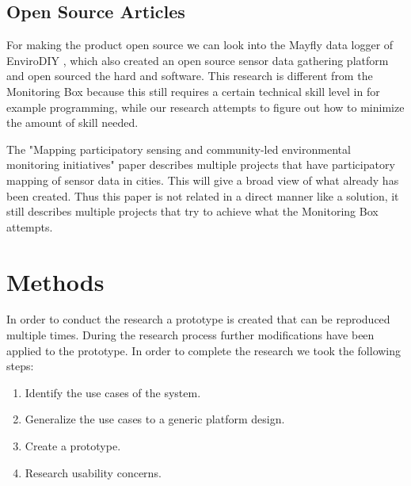 \documentclass[conference]{IEEEtran}
\begin{document}
\subsection{Open Source Articles}
For making the product open source we can look into the Mayfly data logger of EnviroDIY \cite{arscott2017publishing},  which also created an open source sensor data gathering platform and open sourced the hard and software. This research is different from the Monitoring Box because this still requires a certain technical skill level in for example programming, while our research attempts to figure out how to minimize the amount of skill needed.
\par
The "Mapping participatory sensing and community-led environmental monitoring initiatives" \cite{balestrinideliverable} paper describes multiple projects that have participatory mapping of sensor data in cities. This will give a broad view of what already has been created. Thus this paper is not related in a direct manner like a solution, it still describes multiple projects that try to achieve what the Monitoring Box attempts.

\section{Methods}
	In order to conduct the research a prototype is created that can be reproduced multiple times. During the research process further modifications have been applied to the prototype. In order to complete the research we took the following steps:
		\begin{enumerate}
			\item Identify the use cases of the system.
			\item Generalize the use cases to a generic platform design.
			\item Create a prototype.
			\item Research usability concerns.
		\end{enumerate}
\end{document}
